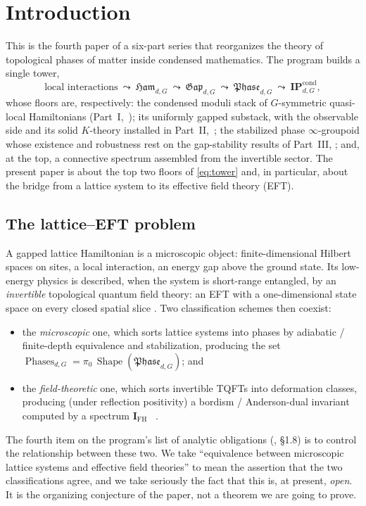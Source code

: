 \documentclass[12pt]{article}
\newcommand{\Shape}{\operatorname{Shape}}      %
\newcommand{\Ham}{\mathfrak{Ham}}              %
\newcommand{\Gap}{\mathfrak{Gap}}              %
\newcommand{\Phase}{\mathfrak{Phase}}          %
\newcommand{\Phases}{\operatorname{Phases}}    %
\newcommand{\IPcond}{\mathbf{IP}^{\mathrm{cond}}}  %
\newcommand{\IFH}{\mathbf{I}_{\mathrm{FH}}}  %
\theoremstyle{definition}
\theoremstyle{remark}
\theoremstyle{plain}
\begin{document}
\tableofcontents

\section{Introduction}
\label{sec:intro}

This is the fourth paper of a six-part series that reorganizes the theory of
topological phases of matter inside condensed mathematics. The program builds a
single tower,
\begin{equation}
\label{eq:tower}
\text{local interactions}
\ \leadsto\ \Ham_{d,G}
\ \leadsto\ \Gap_{d,G}
\ \leadsto\ \Phase_{d,G}
\ \leadsto\ \IPcond_{d,G},
\end{equation}
whose floors are, respectively: the condensed moduli stack of $G$-symmetric
quasi-local Hamiltonians (Part~I,~\cite{paperLocality}); its uniformly gapped
substack, with the observable side and its solid $K$-theory installed in
Part~II,~\cite{paperPositivity}; the stabilized phase $\infty$-groupoid whose
existence and robustness rest on the gap-stability results of Part~III,
\cite{paperGap}; and, at the top, a connective spectrum assembled from the
invertible sector. The present paper is about the top two floors of
\eqref{eq:tower} and, in particular, about the bridge from a lattice system to
its effective field theory (EFT).

\subsection{The lattice--EFT problem}

A gapped lattice Hamiltonian is a microscopic object: finite-dimensional Hilbert
spaces on sites, a local interaction, an energy gap above the ground state. Its
low-energy physics is described, when the system is short-range entangled, by an
\emph{invertible} topological quantum field theory: an EFT with a
one-dimensional state space on every closed spatial slice
\cite{freed-sre,freed-hopkins}. Two classification schemes then coexist:
\begin{itemize}
\item the \emph{microscopic} one, which sorts lattice systems into phases by
  adiabatic / finite-depth equivalence and stabilization, producing the set
  $\Phases_{d,G}=\pi_0\,\Shape(\Phase_{d,G})$; and
\item the \emph{field-theoretic} one, which sorts invertible TQFTs into
  deformation classes, producing (under reflection positivity) a bordism /
  Anderson-dual invariant computed by a spectrum $\IFH$~%
  \cite{freed-hopkins,kapustin-cobordism,gaiotto-jf,xiong-minimalist}.
\end{itemize}
The fourth item on the program's list of analytic obligations
(\cite{paperLocality}, \S1.8) is to control the relationship between these two.
We take ``equivalence between microscopic lattice systems and effective field
theories'' to mean the assertion that the two classifications agree, and we take
seriously the fact that this is, at present, \emph{open}. It is the organizing
conjecture of the paper, not a theorem we are going to prove.
\end{document}
